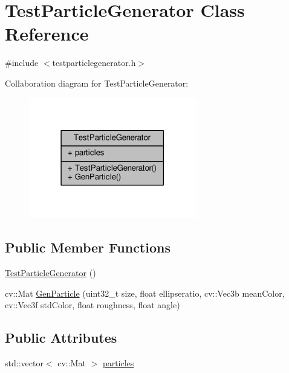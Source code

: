 \hypertarget{class_test_particle_generator}{}\section{Test\+Particle\+Generator Class Reference}
\label{class_test_particle_generator}


{\ttfamily \#include $<$testparticlegenerator.\+h$>$}



Collaboration diagram for Test\+Particle\+Generator\+:\nopagebreak
\begin{figure}[H]
\begin{center}
\leavevmode
\includegraphics[width=207pt]{class_test_particle_generator__coll__graph}
\end{center}
\end{figure}
\subsection*{Public Member Functions}
\begin{DoxyCompactItemize}
\item 
\hyperlink{class_test_particle_generator_a9caab4b3afc670e80408824c288172da}{Test\+Particle\+Generator} ()
\item 
cv\+::\+Mat \hyperlink{class_test_particle_generator_a426ee00dfeb668fd44a1d2c070d47e49}{Gen\+Particle} (uint32\+\_\+t size, float ellipseratio, cv\+::\+Vec3b mean\+Color, cv\+::\+Vec3f std\+Color, float roughness, float angle)
\end{DoxyCompactItemize}
\subsection*{Public Attributes}
\begin{DoxyCompactItemize}
\item 
std\+::vector$<$ cv\+::\+Mat $>$ \hyperlink{class_test_particle_generator_a1e4b2448d046a953a6033a8a60354aa4}{particles}
\end{DoxyCompactItemize}


